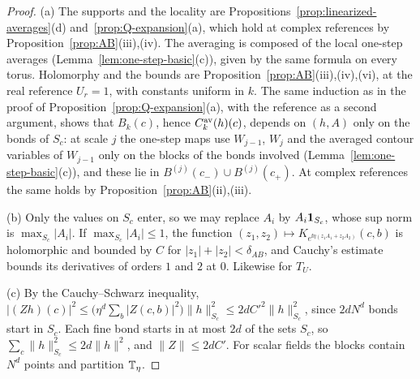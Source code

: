 \begin{proof}
(a) The supports and the locality are Propositions~\ref{prop:linearized-averages}(d) and~\ref{prop:Q-expansion}(a), which hold at complex references by Proposition~\ref{prop:AB}(iii),(iv). The averaging is composed of the local one-step averages (Lemma~\ref{lem:one-step-basic}(c)), given by the same formula on every torus. Holomorphy and the bounds are Proposition~\ref{prop:AB}(iii),(iv),(vi), at the real reference $U_r=1$, with constants uniform in $k$. The same induction as in the proof of Proposition~\ref{prop:Q-expansion}(a), with the reference as a second argument, shows that $B_k(c)$, hence $C^{\rm av}_k(h)(c)$, depends on $(h,A)$ only on the bonds of $S_c$: at scale $j$ the one-step maps use $W_{j-1}$, $W_j$ and the averaged contour variables of $W_{j-1}$ only on the blocks of the bonds involved (Lemma~\ref{lem:one-step-basic}(c)), and these lie in $B^{(j)}(c_-)\cup B^{(j)}(c_+)$. At complex references the same holds by Proposition~\ref{prop:AB}(ii),(iii).

(b) Only the values on $S_c$ enter, so we may replace $A_i$ by $A_i\mathbf 1_{S_c}$, whose sup norm is $\max_{S_c}|A_i|$. If $\max_{S_c}|A_i|\le1$, the function $(z_1,z_2)\mapsto K_{e^{\ii\eta(z_1A_1+z_2A_2)}}(c,b)$ is holomorphic and bounded by $C$ for $|z_1|+|z_2|<\delta_{AB}$, and Cauchy's estimate bounds its derivatives of orders $1$ and $2$ at $0$. Likewise for $T_U$.

(c) By the Cauchy--Schwarz inequality, $|(Zh)(c)|^2\le\big(\eta^d\sum_{b}|Z(c,b)|^2\big)\|h\|^2_{S_c}\le2dC'^2\|h\|^2_{S_c}$, since $2dN^d$ bonds start in $S_c$. Each fine bond starts in at most $2d$ of the sets $S_c$, so $\sum_c\|h\|^2_{S_c}\le2d\|h\|^2$, and $\|Z\|\le2dC'$. For scalar fields the blocks contain $N^d$ points and partition $\mathbb T_\eta$.
\end{proof}

